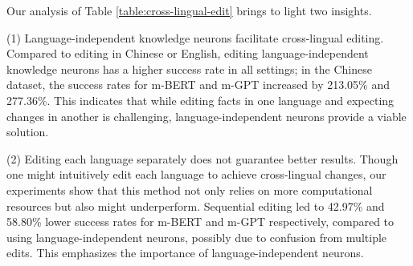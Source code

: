 \documentclass[]{article}
\begin{document}
Our analysis of Table \ref{table:cross-lingual-edit} brings to light two insights.

(1) Language-independent knowledge neurons facilitate cross-lingual editing. Compared to editing in Chinese or English, editing language-independent knowledge neurons has a higher success rate in all settings; in the Chinese dataset, the success rates for m-BERT and m-GPT increased by 213.05\% and 277.36\%. This indicates that while editing facts in one language and expecting changes in another is challenging, language-independent neurons provide a viable solution.

(2) Editing each language separately does not guarantee better results. Though one might intuitively edit each language to achieve cross-lingual changes, our experiments show that this method not only relies on more computational resources but also might underperform. Sequential editing led to 42.97\% and 58.80\% lower success rates for m-BERT and m-GPT respectively, compared to using language-independent neurons, possibly due to confusion from multiple edits. This emphasizes the importance of language-independent neurons.
\begin{table}
\centering
{}
\caption{Results of cross-lingual knowledge editing. LIKN represents editing language-independent knowledge neurons, Mono-KN denotes editing knowledge neurons in one language's dataset corresponding to another, and Seq-KN denotes sequentially editing knowledge neurons in two languages. The symbol `\textuparrow` shows a success rate increase in LIKN over Mono-KN, represented as $\frac{\text{LIKN} - \text{Mono-KN}}{\text{Mono-KN}}$, and `\textdownarrow` indicates a decrease in LIKN compared to Seq-KN, represented as $\frac{\text{LIKN} - \text{Seq-KN}}{\text{LIKN}}$.}

\label{table:cross-lingual-edit}
\end{table}
\end{document}
